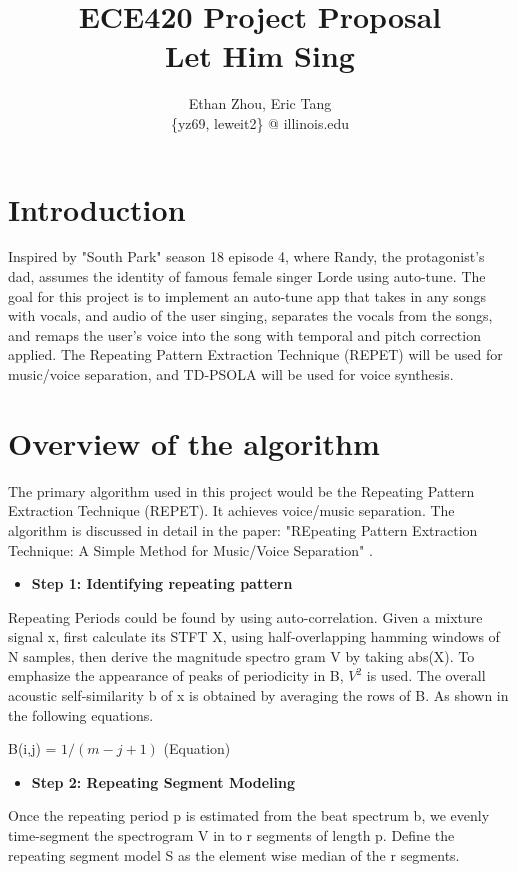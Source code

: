 \documentclass[journal,onecolumn, draftclsnofoot, 12pt]{IEEEtran}
\title{ECE420 Project Proposal\\ Let Him Sing }
\author{Ethan Zhou, Eric Tang \\
\{yz69, leweit2\} @ illinois.edu}
\begin{document}
\maketitle
\section{Introduction}
Inspired by "South Park" season 18 episode 4, where Randy, the protagonist's dad, assumes the identity of famous female singer Lorde using auto-tune. The goal for this project is to implement an auto-tune app that takes in any songs with vocals, and audio of the user singing, separates the vocals from the songs, and remaps the user's voice into the song with temporal and pitch correction applied. The Repeating Pattern Extraction Technique (REPET) will be used for music/voice separation, and TD-PSOLA will be used for voice synthesis.

\section{Overview of the algorithm}
The primary algorithm used in this project would be the Repeating Pattern Extraction Technique (REPET). It achieves voice/music separation. The algorithm is discussed in detail in the paper: "REpeating Pattern Extraction Technique: A Simple Method for Music/Voice Separation" \cite{rafii2012repeating}.

\vspace{0.5cm}
\begin{itemize}
    \item \textbf{Step 1: Identifying repeating pattern} 
\end{itemize}
\begin{description}
   Repeating Periods could be found by using auto-correlation. Given a mixture signal x, first calculate its STFT X, using half-overlapping hamming windows of N samples, then derive the magnitude spectro gram V by taking abs(X). To emphasize the appearance of peaks of periodicity in B, $V^2$ is used. The overall acoustic self-similarity b of x is obtained by averaging the rows of B. As shown in the following equations.
\end{description}


    B(i,j) = $1/(m-j+1)$ (Equation)

\vspace{0.5cm}
\begin{itemize}
    \item \textbf{Step 2: Repeating Segment Modeling} 
\end{itemize}
\begin{description}
   Once the repeating period p is estimated from the beat spectrum b, we evenly time-segment the spectrogram V in to r segments of length p. Define the repeating segment model S as the element wise median of the r segments.   
\end{description}
\end{document}

